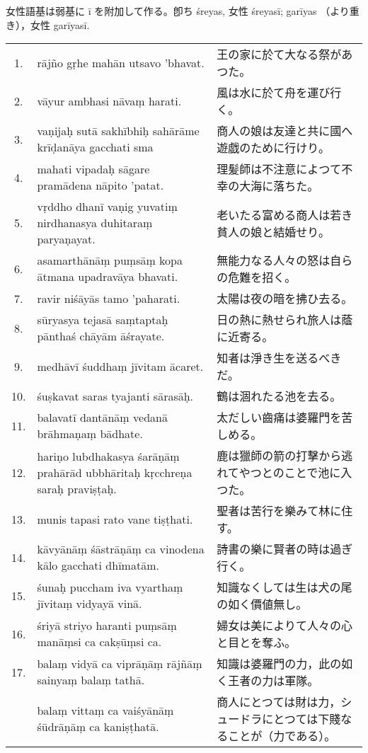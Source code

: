 女性語基は弱基に ī を附加して作る。卽ち śreyas, 女性
śreyasī; garīyas （より重き），女性 garīyasī.

\begin{longtable}{c*{2}{p{0.45\hsize}}}
 1. & rājño gṛhe mahān utsavo 'bhavat. & 王の家に於て大なる祭があつた。\\
 2. & vāyur ambhasi nāvaṃ ha\-rati. & 風は水に於て舟を運び行く。\\
 3. & vaṇijaḥ sutā sakhībhiḥ sa\-hārāme krīḍanāya gacchati sma & 商人の娘は友達と共に國へ遊戯のために行けり。\\
 4. & mahati vipadaḥ sāgare pra\-mādena nāpito 'patat. & 理髪師は不注意によつて不幸の大海に落ちた。\\
 5. & vṛddho dhanī vaṇig yuvatiṃ nirdhanasya duhitaraṃ parya\-ṇayat. & 老いたる富める商人は若き貧人の娘と結婚せり。\\
 6. & asamarthānāṃ puṃsāṃ kopa ātmana upadravāya bhavati. & 無能力なる人々の怒は自らの危難を招く。\\
 7. & ravir niśāyās tamo 'paharati. & 太陽は夜の暗を拂ひ去る。\\
 8. & sūryasya tejasā saṃtaptaḥ pānthaś chāyām āśrayate. & 日の熱に熱せられ旅人は蔭に近寄る。\\
 9. & medhāvī śuddhaṃ jīvitam ācaret. & 知者は淨き生を送るべきだ。\\
10. & śuṣkavat saras tyajanti sā\-rasāḥ. & 鶴は涸れたる池を去る。\\
11. & balavatī dantānāṃ vedanā brāhmaṇaṃ bādhate. & 太だしい齒痛は婆羅門を苦しめる。\\
12. & hariṇo lubdhakasya śarāṇāṃ prahārād ubbhāritaḥ kṛcchreṇa saraḥ praviṣṭaḥ. & 鹿は獵師の箭の打擊から逃
れてやつとのことで池に入つた。\\
13. & munis tapasi rato vane tiṣṭhati. & 聖者は苦行を樂みて林に住す。\\
14. & kāvyānāṃ śāstrāṇāṃ ca vino\-dena kālo gacchati dhīmatām. & 詩書の樂に賢者の時は過ぎ行く。\\
15. & śunaḥ puccham iva vyarthaṃ jīvitaṃ vidyayā vinā. & 知識なくしては生は犬の尾の如く價値無し。\\
16. & śriyā striyo haranti puṃsāṃ manāṃsi ca cakṣūṃsi ca. & 婦女は美によりて人々の心と目とを奪ふ。\\
17. & balaṃ vidyā ca viprāṇāṃ rājñāṃ sainyaṃ balaṃ tathā. &知識は婆羅門の力，此の如く王者の力は軍隊。\\
& balaṃ vittaṃ ca vaiśyānāṃ śūdrāṇāṃ ca kaniṣṭhatā. & 商人にとつては財は力，シュードラにとつては下賤な
ることが（力である）。
\end{longtable}

